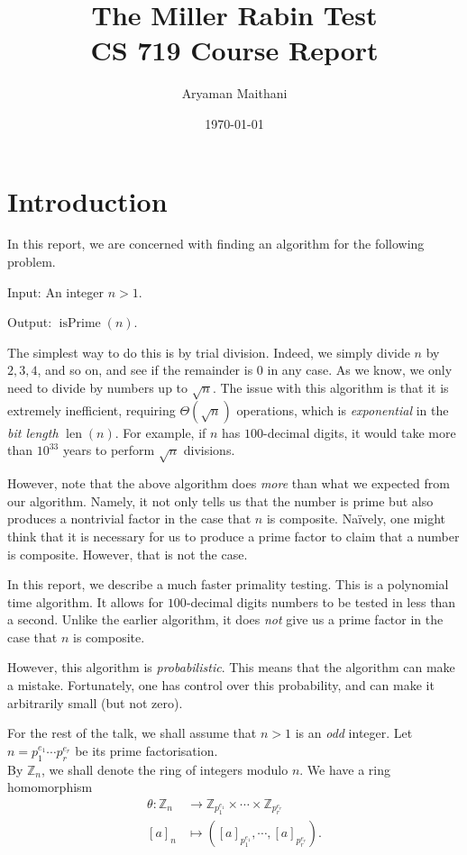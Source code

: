 \documentclass[12pt]{article}
\title{The Miller Rabin Test\\\small CS 719 Course Report}
\author{Aryaman Maithani}
\date{\today}
\DeclareMathOperator{\len}{len}
\begin{document}
\maketitle
\tableofcontents

\section{Introduction}
    In this report, we are concerned with finding an algorithm for the following problem. 

    \begin{tcolorbox}
        {\color{blue}Input:} An integer $n > 1$. 

        {\color{blue}Output:} $\operatorname{isPrime}(n)$.
    \end{tcolorbox}

    The simplest way to do this is by trial division. Indeed, we simply divide $n$ by $2, 3, 4$, and so on, and see if the remainder is $0$ in any case. As we know, we only need to divide by numbers up to $\sqrt{n}$. The issue with this algorithm is that it is extremely inefficient, requiring $\Theta(\sqrt{n})$ operations, which is \emph{exponential} in the \emph{bit length} $\len(n)$. For example, if $n$ has $100$-decimal digits, it would take more than $10^{33}$ years to perform $\sqrt{n}$ divisions. 

    However, note that the above algorithm does \emph{more} than what we expected from our algorithm. Namely, it not only tells us that the number is prime but also produces a nontrivial factor in the case that $n$ is composite. Na\"{i}vely, one might think that it is necessary for us to produce a prime factor to claim that a number is composite. However, that is not the case.

    In this report, we describe a much faster primality testing. This is a polynomial time algorithm. It allows for $100$-decimal digits numbers to be tested in less than a second. Unlike the earlier algorithm, it does \emph{not} give us a prime factor in the case that $n$ is composite. 

    However, this algorithm is \emph{probabilistic}. This means that the algorithm can make a mistake. Fortunately, one has control over this probability, and can make it arbitrarily small (but not zero).

    For the rest of the talk, we shall assume that $n > 1$ is an \emph{odd} integer. 
    Let $n = p_{1}^{e_{1}} \cdots p_{r}^{e_{r}}$ be its prime factorisation. \\
    By $\mathbb{Z}_{n}$, we shall denote the ring of integers modulo $n$. We have a ring homomorphism
    \begin{align*} 
        \theta : \mathbb{Z}_{n} &\to \mathbb{Z}_{p_{1}^{e_1}} \times \cdots \times \mathbb{Z}_{p_{r}^{e_{r}}} \\
        [a]_{n} &\mapsto ([a]_{p_{1}^{e_1}}, \cdots, [a]_{p_{r}^{e_{r}}}).
    \end{align*}
     
\end{document}
